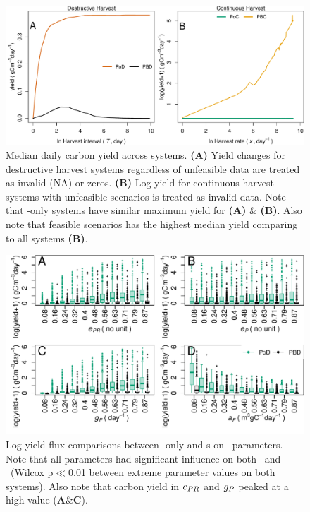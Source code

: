 \documentclass[../thesis.tex]{subfiles} %
\begin{document}
\begin{figure}[H]
    \centering
    \includegraphics[width=\linewidth]{result/DailyYield.pdf}
    \caption[Median daily carbon yield across systems]{Median daily carbon yield across systems.  \textbf{(A)} Yield changes for destructive harvest systems regardless of unfeasible data are treated as invalid (NA) or zeros.  \textbf{(B)} Log yield for continuous harvest systems with unfeasible scenarios is treated as invalid data.  Note that \phy-only systems have similar maximum yield for \textbf{(A)} \& \textbf{(B)}.  Also note that feasible scenarios has the highest median yield comparing to all systems \textbf{(B)}.\lnExplain}
    \label{f:ydDaily}
\end{figure}

\begin{figure}[H]
    \centering
    \includegraphics[width=\linewidth]{result/bacEff1.pdf}
    \caption[Log yield flux comparisons between feasible \phy-only and \pbs s]{Log yield flux comparisons between \phy-only and \pbs s on \phy\ parameters.  Note that all parameters had significant influence on both \PoN\ and \PBN\ (Wilcox p$\ll$0.01 between extreme parameter values on both systems).  Also note that carbon yield in $e_{PR}$ and $g_P$ peaked at a high value (\textbf{A}\&\textbf{C}).\lnExplain}
    \label{f:bacEffect}
\end{figure}
\end{document}
